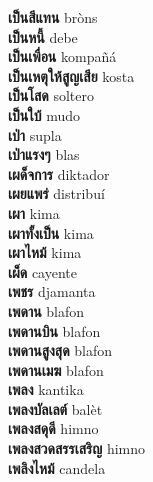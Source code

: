 \textbf{ เป็นสีแทน  } bròns \\
\textbf{ เป็นหนี้  } debe \\
\textbf{ เป็นเพื่อน  } kompañá \\
\textbf{ เป็นเหตุให้สูญเสีย  } kosta \\
\textbf{ เป็นโสด  } soltero \\
\textbf{ เป็นใบ้  } mudo \\
\textbf{ เป่า  } supla \\
\textbf{ เป่าแรงๆ  } blas \\
\textbf{ เผด็จการ  } diktador \\
\textbf{ เผยแพร่  } distribuí \\
\textbf{ เผา  } kima \\
\textbf{ เผาทั้งเป็น  } kima \\
\textbf{ เผาไหม้  } kima \\
\textbf{ เผ็ด  } cayente \\
\textbf{ เพชร  } djamanta \\
\textbf{ เพดาน  } blafon \\
\textbf{ เพดานบิน  } blafon \\
\textbf{ เพดานสูงสุด  } blafon \\
\textbf{ เพดานเมฆ  } blafon \\
\textbf{ เพลง  } kantika \\
\textbf{ เพลงบัลเลต์  } balèt \\
\textbf{ เพลงสดุดี  } himno \\
\textbf{ เพลงสวดสรรเสริญ  } himno \\
\textbf{ เพลิงไหม้  } candela \\
